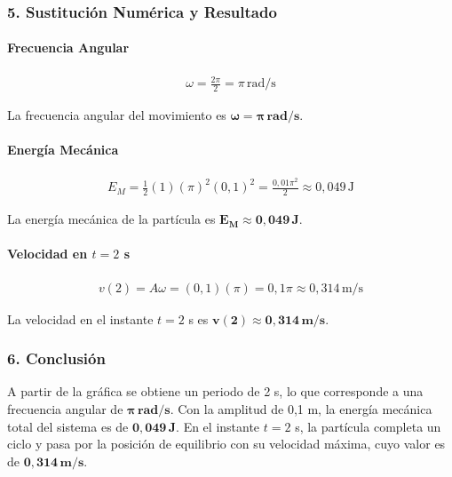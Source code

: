 \subsubsection*{5. Sustitución Numérica y Resultado}
\paragraph*{Frecuencia Angular}
\begin{gather}
    \omega = \frac{2\pi}{2} = \pi \, \text{rad/s}
\end{gather}
\begin{cajaresultado}
    La frecuencia angular del movimiento es $\boldsymbol{\omega = \pi \, rad/s}$.
\end{cajaresultado}
\paragraph*{Energía Mecánica}
\begin{gather}
    E_M = \frac{1}{2} (1) (\pi)^2 (0,1)^2 = \frac{0,01 \pi^2}{2} \approx 0,049 \, \text{J}
\end{gather}
\begin{cajaresultado}
    La energía mecánica de la partícula es $\boldsymbol{E_M \approx 0,049 \, J}$.
\end{cajaresultado}
\paragraph*{Velocidad en $t=2$ s}
\begin{gather}
    v(2) = A \omega = (0,1)(\pi) = 0,1\pi \approx 0,314 \, \text{m/s}
\end{gather}
\begin{cajaresultado}
    La velocidad en el instante $t=2$ s es $\boldsymbol{v(2) \approx 0,314 \, m/s}$.
\end{cajaresultado}

\subsubsection*{6. Conclusión}
\begin{cajaconclusion}
    A partir de la gráfica se obtiene un periodo de 2 s, lo que corresponde a una frecuencia angular de $\mathbf{\pi \, rad/s}$. Con la amplitud de 0,1 m, la energía mecánica total del sistema es de $\mathbf{0,049 \, J}$. En el instante $t=2$ s, la partícula completa un ciclo y pasa por la posición de equilibrio con su velocidad máxima, cuyo valor es de $\mathbf{0,314 \, m/s}$.
\end{cajaconclusion}

